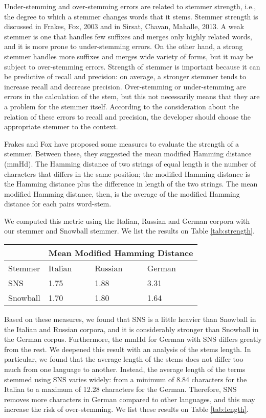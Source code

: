 Under-stemming and over-stemming errors are related to stemmer strength, i.e., the degree to which a stemmer changes words that it stems. Stemmer strength is discussed in Frakes, Fox, 2003\cite{frakes} and in Sirsat, Chavan, Mahalle, 2013\cite{sirsat}. A weak stemmer is one that handles few suffixes and merges only highly related words, and it is more prone to under-stemming errors. On the other hand, a strong stemmer handles more suffixes and merges wide variety of forms, but it may be subject to over-stemming errors. Strength of stemmer is important because it can be
predictive of recall and precision: on average, a stronger stemmer tends to increase recall and decrease precision. Over-stemming or under-stemming are errors in the calculation of the stem, but this not necessarily means that they are a problem for the stemmer itself. According to the consideration about the relation of these errors to recall and precision, the developer should choose the appropriate stemmer to the context. 

Frakes and Fox have proposed some measures to evaluate the strength of a stemmer. Between these, they suggested the mean modified Hamming distance (mmHd). The Hamming distance of two strings of equal length is the number of characters that differs in the same position; the modified Hamming distance is the Hamming distance plus the difference in length of the two strings. The mean modified Hamming distance, then, is the average of the modified Hamming distance for each pairs word-stem.

We computed this metric using the Italian, Russian and German corpora with our stemmer and Snowball stemmer. We list the results on Table \ref{tab:strength}.

\begin{center}
   \begin{tabular}{| l | l | l | l |}
    \hline
    & \multicolumn{3}{l|}{\textbf{Mean Modified Hamming Distance}}\\ \hline
    Stemmer & Italian & Russian & German\\ \hline
    SNS & 1.75 & 1.88 & 3.31 \\ \hline
    Snowball & 1.70 & 1.80 & 1.64\\ \hline    
    \end{tabular}
    \label{tab:strength}
\end{center}

Based on these measures, we found that SNS is a little heavier than Snowball in the Italian and Russian corpora, and it is considerably stronger than Snowball in the German corpus. Furthermore, the mmHd for German with SNS differs greatly from the rest. We deepened this result with an analysis of the stems length. In particular, we found that the average length of the stems does not differ too much from one language to another. Instead, the average length of the terms stemmed using SNS varies widely: from a minimum of 8.84 characters for the Italian to a maximum of 12.28 characters for the German. Therefore, SNS removes more characters in German compared to other languages, and this may increase the risk of over-stemming. We list these results on Table \ref{tab:length}.


